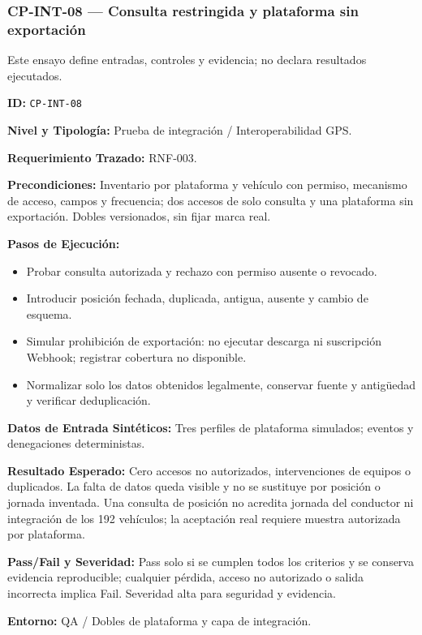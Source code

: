 \subsubsection*{CP-INT-08 — Consulta restringida y plataforma sin exportación}\label{sec:9-cp-int-08}

Este ensayo define entradas, controles y evidencia; no declara resultados ejecutados.

\par\noindent\textbf{ID:} \texttt{CP-\allowbreak{}INT-\allowbreak{}08}\par
\par\noindent\textbf{Nivel y Tipología:} Prueba de integración / Interoperabilidad GPS.\par
\par\noindent\textbf{Requerimiento Trazado:} RNF-003.\par
\par\noindent\textbf{Precondiciones:} Inventario por plataforma y vehículo con permiso, mecanismo de acceso, campos y frecuencia; dos accesos de solo consulta y una plataforma sin exportación. Dobles versionados, sin fijar marca real.\par
\par\noindent\textbf{Pasos de Ejecución:}\par
\begin{itemize}
\item Probar consulta autorizada y rechazo con permiso ausente o revocado.
\item Introducir posición fechada, duplicada, antigua, ausente y cambio de esquema.
\item Simular prohibición de exportación: no ejecutar descarga ni suscripción Webhook; registrar cobertura no disponible.
\item Normalizar solo los datos obtenidos legalmente, conservar fuente y antigüedad y verificar deduplicación.
\end{itemize}

\par\noindent\textbf{Datos de Entrada Sintéticos:} Tres perfiles de plataforma simulados; eventos y denegaciones deterministas.\par
\par\noindent\textbf{Resultado Esperado:} Cero accesos no autorizados, intervenciones de equipos o duplicados. La falta de datos queda visible y no se sustituye por posición o jornada inventada. Una consulta de posición no acredita jornada del conductor ni integración de los 192 vehículos; la aceptación real requiere muestra autorizada por plataforma.\par
\par\noindent\textbf{Pass/Fail y Severidad:} Pass solo si se cumplen todos los criterios y se conserva evidencia reproducible; cualquier pérdida, acceso no autorizado o salida incorrecta implica Fail. Severidad alta para seguridad y evidencia.\par
\par\noindent\textbf{Entorno:} QA / Dobles de plataforma y capa de integración.\par


